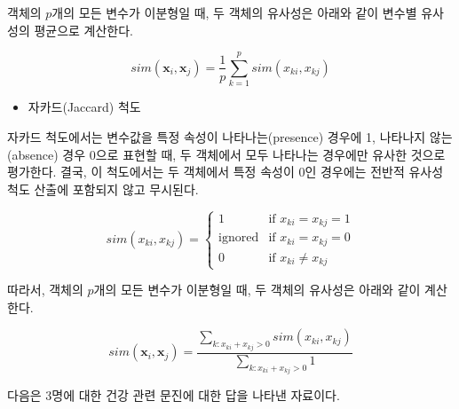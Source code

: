\documentclass[]{book}
\providecommand{\tightlist}{%
  \setlength{\itemsep}{0pt}\setlength{\parskip}{0pt}}
\begin{document}
객체의 \(p\)개의 모든 변수가 이분형일 때, 두 객체의 유사성은 아래와 같이 변수별 유사성의 평균으로 계산한다.

\begin{equation*}
sim(\mathbf{x}_i, \mathbf{x}_j) = \frac{1}{p} \sum_{k = 1}^{p} sim(x_{ki}, x_{kj})
\end{equation*}

\begin{itemize}
\tightlist
\item
  자카드(Jaccard) 척도
\end{itemize}

자카드 척도에서는 변수값을 특정 속성이 나타나는(presence) 경우에 1, 나타나지 않는(absence) 경우 0으로 표현할 때, 두 객체에서 모두 나타나는 경우에만 유사한 것으로 평가한다. 결국, 이 척도에서는 두 객체에서 특정 속성이 0인 경우에는 전반적 유사성 척도 산출에 포함되지 않고 무시된다.

\begin{equation*}
sim(x_{ki}, x_{kj}) = \begin{cases}
1 & \text{if } x_{ki} = x_{kj} = 1\\
\text{ignored} & \text{if } x_{ki} = x_{kj} = 0\\
0 & \text{if } x_{ki} \neq x_{kj}
\end{cases}
\end{equation*}

따라서, 객체의 \(p\)개의 모든 변수가 이분형일 때, 두 객체의 유사성은 아래와 같이 계산한다.

\begin{equation*}
sim(\mathbf{x}_i, \mathbf{x}_j) = \frac{\sum_{k: x_{ki} + x_{kj} > 0} sim(x_{ki}, x_{kj})}{\sum_{k: x_{ki} + x_{kj} > 0} 1}
\end{equation*}

다음은 3명에 대한 건강 관련 문진에 대한 답을 나타낸 자료이다.
\end{document}
